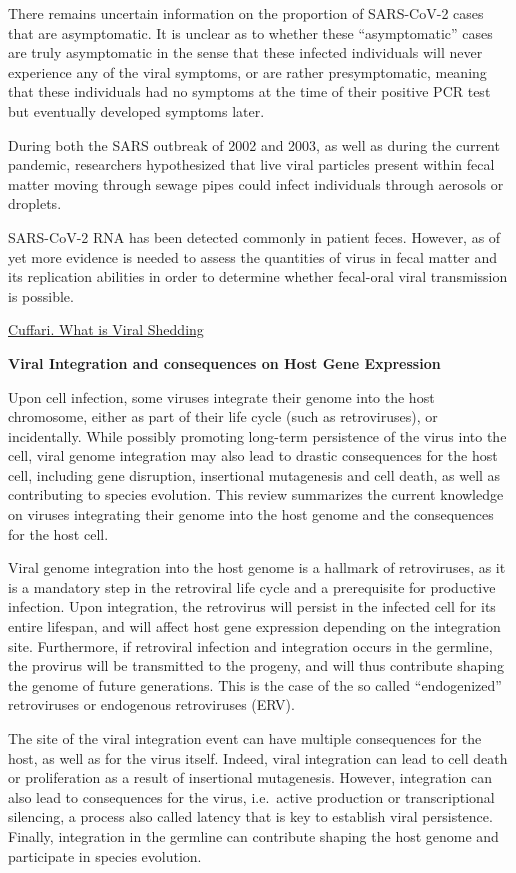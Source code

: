 \documentclass[
]{book}
\begin{document}
There remains uncertain information on the proportion of SARS-CoV-2 cases that are asymptomatic.
It is unclear as to whether these ``asymptomatic'' cases are truly asymptomatic in the sense that these infected individuals will never experience any of the viral symptoms, or are rather presymptomatic, meaning that these individuals had no symptoms at the time of their positive PCR test but eventually developed symptoms later.

During both the SARS outbreak of 2002 and 2003, as well as during the current pandemic, researchers hypothesized that live viral particles present within fecal matter moving through sewage pipes could infect individuals through aerosols or droplets.

SARS-CoV-2 RNA has been detected commonly in patient feces. However, as of yet more evidence is needed to assess the quantities of virus in fecal matter and its replication abilities in order to determine whether fecal-oral viral transmission is possible.

\href{https://www.news-medical.net/health/What-is-Viral-Shedding.aspx}{Cuffari. What is Viral Shedding}

\textbf{Viral Integration and consequences on Host Gene Expression}

Upon cell infection, some viruses integrate their genome into the host chromosome, either as part of their life cycle (such as retroviruses), or incidentally. While possibly promoting long-term persistence of the virus into the cell, viral genome integration may also lead to drastic consequences for the host cell, including gene disruption, insertional mutagenesis and cell death, as well as contributing to species evolution. This review summarizes the current knowledge on viruses integrating their genome into the host genome and the consequences for the host cell.

Viral genome integration into the host genome is a hallmark of retroviruses, as it is a mandatory step in the retroviral life cycle and a prerequisite for productive infection. Upon integration, the retrovirus will persist in the infected cell for its entire lifespan, and will affect host gene expression depending on the integration site. Furthermore, if retroviral infection and integration occurs in the germline, the provirus will be transmitted to the progeny, and will thus contribute shaping the genome of future generations. This is the case of the so called ``endogenized'' retroviruses or endo­genous retroviruses (ERV).

The site of the viral integration event can have multiple consequences for the host, as well as for the virus itself. Indeed, viral integration can lead to cell death or proliferation as a result of insertional mutagenesis. However, integration can also lead to consequences for the virus, i.e.~active production or transcriptional silencing, a process also called latency that is key to establish viral persistence. Finally, integration in the germline can contribute shaping the host genome and participate in species evolution.
\end{document}
